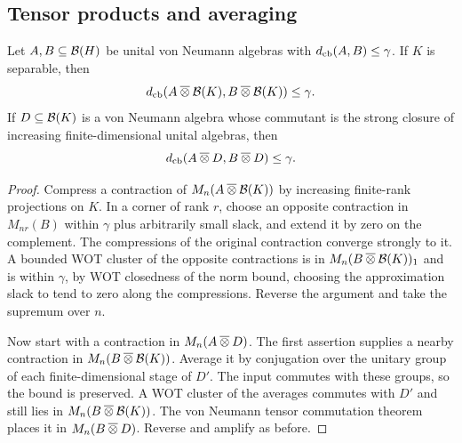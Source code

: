 \subsection{Tensor products and averaging}

\begin{lemma}\label{lem:tensor-gap}
Let $A,B\subseteq\mathcal B(H)$ be unital von Neumann algebras with
$d_{\mathrm{cb}}(A,B)\le\gamma$. If $K$ is separable, then
\[
 d_{\mathrm{cb}}(A\mathbin{\overline\otimes}\mathcal B(K),B\mathbin{\overline\otimes}\mathcal B(K))\le\gamma.
\]
If $D\subseteq\mathcal B(K)$ is a von Neumann algebra whose commutant is the
strong closure of increasing finite-dimensional unital algebras, then
\[
 d_{\mathrm{cb}}(A\mathbin{\overline\otimes} D,B\mathbin{\overline\otimes} D)\le\gamma.
\]
\end{lemma}

\begin{proof}
Compress a contraction of $M_n(A\mathbin{\overline\otimes}\mathcal B(K))$ by increasing
finite-rank projections on $K$. In a corner of rank $r$, choose an
opposite contraction in $M_{nr}(B)$ within $\gamma$ plus arbitrarily
small slack, and extend it by zero on the complement. The compressions
of the original contraction converge strongly to it. A bounded WOT
cluster of the opposite contractions is in $M_n(B\mathbin{\overline\otimes}\mathcal B(K))_1$
and is within $\gamma$, by WOT closedness of the norm bound, choosing
the approximation slack to tend to zero along the compressions. Reverse
the argument and take the supremum over $n$.

Now start with a contraction in $M_n(A\mathbin{\overline\otimes} D)$. The first
assertion supplies a nearby contraction in
$M_n(B\mathbin{\overline\otimes}\mathcal B(K))$. Average it by conjugation over the unitary
group of each finite-dimensional stage of $D'$. The input commutes
with these groups, so the bound is preserved. A WOT cluster of the
averages commutes with $D'$ and still lies in
$M_n(B\mathbin{\overline\otimes}\mathcal B(K))$. The von Neumann tensor commutation theorem
\cite[Theorem~III.4.5.8 and Corollary~III.4.5.9, pp.~319--320]{BlackadarOperatorAlgebras}
places it in $M_n(B\mathbin{\overline\otimes} D)$. Reverse and amplify as before.
\end{proof}

